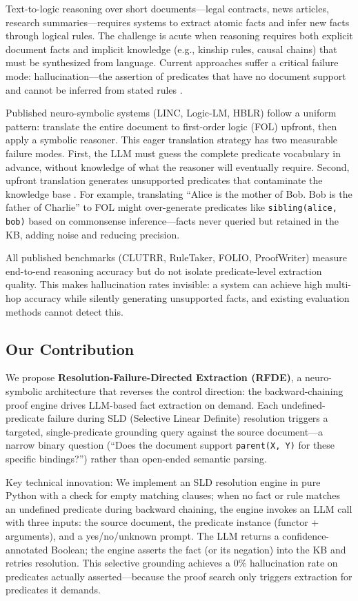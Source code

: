 \documentclass[11pt,letterpaper]{article}
\begin{document}
Text-to-logic reasoning over short documents---legal contracts, news articles, research summaries---requires systems to extract
atomic facts and infer new facts through logical rules. The challenge is acute when reasoning requires both explicit document
facts and implicit knowledge (e.g., kinship rules, causal chains) that must be synthesized from language. Current approaches
suffer a critical failure mode: hallucination---the assertion of predicates that have no document support and cannot be inferred
from stated rules \citep{Olausson2023}.

Published neuro-symbolic systems (LINC, Logic-LM, HBLR) follow a uniform pattern: translate the entire document to
first-order logic (FOL) upfront, then apply a symbolic reasoner. This eager translation strategy has two measurable failure
modes. First, the LLM must guess the complete predicate vocabulary in advance, without knowledge of what the reasoner will
eventually require. Second, upfront translation generates unsupported predicates that contaminate the knowledge base
\citep{Olausson2023}. For example, translating ``Alice is the mother of Bob. Bob is the father of Charlie'' to FOL might
over-generate predicates like \texttt{sibling(alice, bob)} based on commonsense inference---facts never queried but retained
in the KB, adding noise and reducing precision.

All published benchmarks (CLUTRR, RuleTaker, FOLIO, ProofWriter) measure end-to-end reasoning accuracy but do not isolate
predicate-level extraction quality. This makes hallucination rates invisible: a system can achieve high multi-hop accuracy
while silently generating unsupported facts, and existing evaluation methods cannot detect this.

\subsection{Our Contribution}

We propose \textbf{Resolution-Failure-Directed Extraction (RFDE)}, a neuro-symbolic architecture that reverses the control
direction: the backward-chaining proof engine drives LLM-based fact extraction on demand. Each undefined-predicate failure
during SLD (Selective Linear Definite) resolution triggers a targeted, single-predicate grounding query against the source
document---a narrow binary question (``Does the document support \texttt{parent(X, Y)} for these specific bindings?'') rather
than open-ended semantic parsing.

Key technical innovation: We implement an SLD resolution engine in pure Python with a check for empty matching clauses; when
no fact or rule matches an undefined predicate during backward chaining, the engine invokes an LLM call with three inputs:
the source document, the predicate instance (functor + arguments), and a yes/no/unknown prompt. The LLM returns a
confidence-annotated Boolean; the engine asserts the fact (or its negation) into the KB and retries resolution. This selective
grounding achieves a 0\% hallucination rate on predicates actually asserted---because the proof search only triggers
extraction for predicates it demands.
\end{document}
